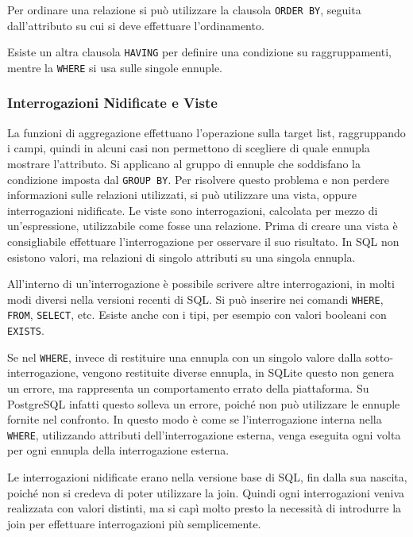 \documentclass{article}
\numberwithin{equation}{subsection}
\begin{document}
Per ordinare una relazione si può utilizzare la clausola \verb|ORDER BY|, seguita dall'attributo su cui si deve effettuare l'ordinamento. 

Esiste un altra clausola \verb|HAVING| per definire una condizione su raggruppamenti, mentre la \verb|WHERE| si usa sulle singole ennuple. 

\subsubsection{Interrogazioni Nidificate e Viste}

La funzioni di aggregazione effettuano l'operazione sulla target list, raggruppando i campi, quindi in alcuni casi non permettono di scegliere di quale ennupla mostrare 
l'attributo. Si applicano al gruppo di ennuple che soddisfano la condizione imposta dal \verb|GROUP BY|. 
Per risolvere questo problema e non perdere informazioni sulle relazioni utilizzati, si può utilizzare una vista, oppure interrogazioni nidificate. Le viste sono 
interrogazioni, calcolata per mezzo di un'espressione, utilizzabile come fosse una relazione. Prima di creare una vista è consigliabile 
effettuare l'interrogazione per osservare il suo risultato. 
In SQL non esistono valori, ma relazioni di singolo attributi su una singola ennupla. 

All'interno di un'interrogazione è possibile scrivere altre interrogazioni, in molti modi diversi nella versioni recenti di SQL. Si può inserire nei comandi \verb|WHERE|, 
\verb|FROM|, \verb|SELECT|, etc. Esiste anche con i tipi, per esempio con valori booleani con \verb|EXISTS|. 

Se nel \verb|WHERE|, invece di restituire una ennupla con un singolo valore dalla sotto-interrogazione, vengono restituite diverse ennupla, in SQLite questo non genera 
un errore, ma rappresenta un comportamento errato della piattaforma. Su PostgreSQL infatti questo solleva un errore, poiché non può utilizzare le ennuple fornite nel 
confronto. In questo modo è come se l'interrogazione interna nella \verb|WHERE|, utilizzando attributi dell'interrogazione esterna, venga eseguita ogni volta per ogni 
ennupla della interrogazione esterna. 

Le interrogazioni nidificate erano nella versione base di SQL, fin dalla sua nascita, poiché non si credeva di poter utilizzare la join. Quindi ogni interrogazioni 
veniva realizzata con valori distinti, ma si capì molto presto la necessità di introdurre la join per effettuare interrogazioni più semplicemente. 
\end{document}
